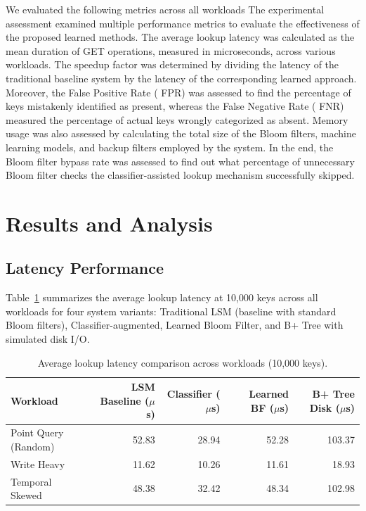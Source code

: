 \documentclass{mnitjaipur}
\begin{document}
We evaluated the following metrics across all workloads The experimental assessment examined multiple performance metrics to evaluate the effectiveness of the proposed learned methods. The average lookup latency was calculated as the mean duration of GET operations, measured in microseconds, across various workloads. The speedup factor was determined by dividing the latency of the traditional baseline system by the latency of the corresponding learned approach. Moreover, the False Positive Rate ( FPR) was assessed to find the percentage of keys mistakenly identified as present, whereas the False Negative Rate ( FNR) measured the percentage of actual keys wrongly categorized as absent. Memory usage was also assessed by calculating the total size of the Bloom filters, machine learning models, and backup filters employed by the system. In the end, the Bloom filter bypass rate was assessed to find out what percentage of unnecessary Bloom filter checks the classifier-assisted lookup mechanism successfully skipped. 

\section{Results and Analysis}

\subsection{Latency Performance}

Table~\ref{tab:latency-results} summarizes the average lookup latency at 10,000 keys across all workloads for four system variants: Traditional LSM (baseline with standard Bloom filters), Classifier-augmented, Learned Bloom Filter, and B+ Tree with simulated disk I/O.

\begin{table}[h]
    \centering
    \begin{tabular}{lrrrr}
        \toprule
        \textbf{Workload} & \textbf{LSM Baseline ($\mu$s)} & \textbf{Classifier ($\mu$s)} & \textbf{Learned BF ($\mu$s)} & \textbf{B+ Tree Disk ($\mu$s)} \\
        \midrule
        Point Query (Random)  & 52.83 & 28.94 & 52.28 & 103.37 \\
        Write Heavy           & 11.62 & 10.26 & 11.61 & 18.93 \\
        Temporal Skewed       & 48.38 & 32.42 & 48.34 & 102.98 \\
        \bottomrule
    \end{tabular}
    \caption{Average lookup latency comparison across workloads (10,000 keys).}
    \label{tab:latency-results}
\end{table}
\end{document}
